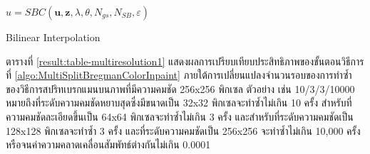 \documentclass[hidelinks, a4paper,12pt]{article}
\numberwithin{equation}{section}							%
\numberwithin{equation}{section}
\begin{document}
{\begin{algorithm}[H]
{			
			$u = SBC(\boldsymbol{u}, \boldsymbol{z}, \lambda, \theta, N_{gs}, N_{SB}, \varepsilon) $  \\
		}
	\end{algorithm}
\begin{algorithm}[H]
		\caption{Bilinear Interpolation}
		\SetAlgoNoLine
	\end{algorithm}
	\clearpage
	\hspace{1cm} ตารางที่ \ref{result:table-multiresolution1} แสดงผลการเปรียบเทียบประสิทธิภาพของขั้นตอนวิธีการที่ \ref{algo:MultiSplitBregmanColorInpaint} ภายใต้การเปลี่ยนแปลงจำนวนรอบของการทำซ้ำของวิธีการสปริทเบรกแมนบนภาพที่มีความคมชัด 256x256 พิกเซล ตัวอย่าง เช่น 10/3/3/10000 หมายถึงที่ระดับความคมชัดหยาบสุดซึ่งมีขนาดเป็น 32x32 พิกเซลจะทำซ้ำไม่เกิน 10 ครั้ง สำหรับที่ความคมชัดละเอียดขึ้นเป็น 64x64 พิกเซลจะทำซ้ำไม่เกิน 3 ครั้ง และสำหรับที่ระดับความคมชัดเป็น 128x128 พิกเซลจะทำซ้ำ 3 ครั้ง และที่ระดับความคมชัดเป็น 256x256 จะทำซ้ำไม่เกิน 10,000 ครั้งหรือจนค่าความคลาดเคลื่อนสัมพัทธ์ต่างกันไม่เกิน 0.0001 
	
}
\end{document}
